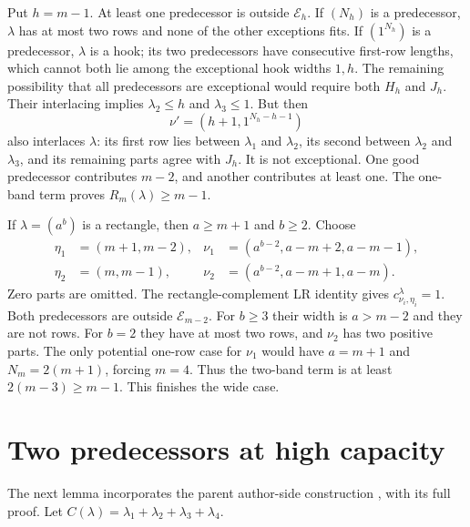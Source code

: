 \documentclass[11pt]{article}
\theoremstyle{remark}\newtheorem{remark}[theorem]{Remark}
\numberwithin{equation}{section}\setlength{\emergencystretch}{2em}
\begin{document}
Put $h=m-1$. At least one predecessor is outside $\mathcal E_h$.
If $(N_h)$ is a predecessor, $\lambda$ has at most two rows and none of
the other exceptions fits. If $(1^{N_h})$ is a predecessor, $\lambda$
is a hook; its two predecessors have consecutive first-row lengths,
which cannot both lie among the exceptional hook widths $1,h$.
The remaining possibility that all predecessors are exceptional would
require both $H_h$ and $J_h$. Their interlacing implies
$\lambda_2\le h$ and $\lambda_3\le1$. But then
\[
 \nu'=(h+1,1^{N_h-h-1})
\]
also interlaces $\lambda$: its first row lies between $\lambda_1$ and
$\lambda_2$, its second between $\lambda_2$ and $\lambda_3$, and its
remaining parts agree with $J_h$. It is not exceptional.
One good predecessor contributes $m-2$, and another contributes at
least one. The one-band term proves $R_m(\lambda)\ge m-1$.

If $\lambda=(a^b)$ is a rectangle, then $a\ge m+1$ and $b\ge2$.
Choose
\begin{align*}
 \eta_1&=(m+1,m-2),&\nu_1&=(a^{b-2},a-m+2,a-m-1),\\
 \eta_2&=(m,m-1),&\nu_2&=(a^{b-2},a-m+1,a-m).
\end{align*}
Zero parts are omitted. The rectangle-complement LR identity gives
$c_{\nu_i,\eta_i}^{\lambda}=1$. Both predecessors are outside
$\mathcal E_{m-2}$. For $b\ge3$ their width is $a>m-2$ and they are
not rows. For $b=2$ they have at most two rows, and $\nu_2$ has two
positive parts. The only potential one-row case for $\nu_1$ would have
$a=m+1$ and $N_m=2(m+1)$, forcing $m=4$. Thus the two-band term is at
least $2(m-3)\ge m-1$. This finishes the wide case.

\section{Two predecessors at high capacity}\label{sec:high}
The next lemma incorporates the parent author-side construction
\cite{parenthigh}, with its full proof. Let
$C(\lambda)=\lambda_1+\lambda_2+\lambda_3+\lambda_4$.
\end{document}
